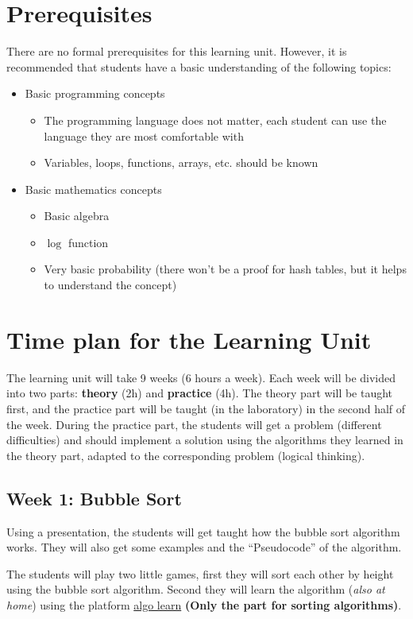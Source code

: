 \documentclass[10pt, oneside]{article}
\theoremstyle{remark}
\begin{document}
\section{Prerequisites}
There are no formal prerequisites for this learning unit. However, it is recommended that students have a basic understanding of the following topics:
\begin{itemize}
  \item Basic programming concepts
  \begin{itemize}
    \item The programming language does not matter, each student can use the language they are most comfortable with
    \item Variables, loops, functions, arrays, etc. should be known
  \end{itemize}
  \item Basic mathematics concepts
  \begin{itemize}
    \item Basic algebra
    \item $\log$ function
    \item Very basic probability (there won't be a proof for hash tables, but it helps to understand the concept)
  \end{itemize}
\end{itemize}

\section{Time plan for the Learning Unit}
The learning unit will take 9 weeks (6 hours a week). Each week will be divided into two parts: \textbf{theory} (2h) and \textbf{practice} (4h). The theory part will be taught first, and the practice part will be taught (in the laboratory) in the second half of the week. During the practice part, the students will get a problem (different difficulties) and should implement a solution using the algorithms they learned in the theory part, adapted to the corresponding problem (logical thinking).

\subsection{Week 1: Bubble Sort}
Using a presentation, the students will get taught how the bubble sort algorithm works. They will also get some examples and the \enquote{Pseudocode} of the algorithm. 

The students will play two little games, first they will sort each other by height using the bubble sort algorithm. Second they will learn the algorithm (\textit{also at home}) using the platform \href{https://tcs.uni-frankfurt.de/algo-learn-testing/refs_heads_feat-bubbleSort/en
}{algo learn} \textbf{(Only the part for sorting algorithms)}.
\end{document}
